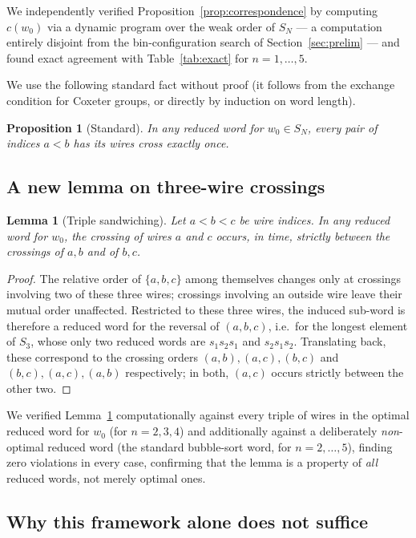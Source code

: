 \documentclass[11pt]{amsart}
\theoremstyle{plain}
\newtheorem{lemma}[theorem]{Lemma}
\newtheorem{proposition}[theorem]{Proposition}
\theoremstyle{definition}
\theoremstyle{remark}
\begin{document}
We independently verified Proposition~\ref{prop:correspondence} by computing $c(w_0)$ via a dynamic program over the weak order of $S_N$ --- a computation entirely disjoint from the bin-configuration search of Section~\ref{sec:prelim} --- and found exact agreement with Table~\ref{tab:exact} for $n=1,\dots,5$.

We use the following standard fact without proof (it follows from the exchange condition for Coxeter groups, or directly by induction on word length).

\begin{proposition}[Standard]
\label{prop:reducedwords}
In any reduced word for $w_0\in S_N$, every pair of indices $a<b$ has its wires cross exactly once.
\end{proposition}

\subsection{A new lemma on three-wire crossings}

\begin{lemma}[Triple sandwiching]
\label{lem:tripleF}
Let $a<b<c$ be wire indices. In any reduced word for $w_0$, the crossing of wires $a$ and $c$ occurs, in time, strictly between the crossings of $a,b$ and of $b,c$.
\end{lemma}

\begin{proof}
The relative order of $\{a,b,c\}$ among themselves changes only at crossings involving two of these three wires; crossings involving an outside wire leave their mutual order unaffected. Restricted to these three wires, the induced sub-word is therefore a reduced word for the reversal of $(a,b,c)$, i.e.\ for the longest element of $S_3$, whose only two reduced words are $s_1s_2s_1$ and $s_2s_1s_2$. Translating back, these correspond to the crossing orders $(a,b),(a,c),(b,c)$ and $(b,c),(a,c),(a,b)$ respectively; in both, $(a,c)$ occurs strictly between the other two.
\end{proof}

We verified Lemma~\ref{lem:tripleF} computationally against every triple of wires in the optimal reduced word for $w_0$ (for $n=2,3,4$) and additionally against a deliberately \emph{non}-optimal reduced word (the standard bubble-sort word, for $n=2,\dots,5$), finding zero violations in every case, confirming that the lemma is a property of \emph{all} reduced words, not merely optimal ones.

\subsection{Why this framework alone does not suffice}
\end{document}
